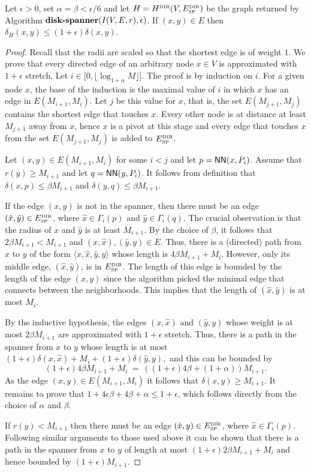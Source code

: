 \documentclass[proceedings]{stacs}
\theoremstyle{plain}\newtheorem{satz}[thm]{Satz}
\theoremstyle{definition}\newtheorem{crucial}[thm]{Crucial Definition}
\newcommand{\SPAN}{\mbox{\bf disk-spanner}}
\newcommand{\NN}{\mbox{\sf NN}}
\def\SP{\mbox{\tiny SP}}
\def\DIR{\mbox{\tiny DIR}}
\begin{document}
\begin{lemma}[Stretch]
Let $\epsilon > 0$, set $\alpha = \beta < \epsilon/6$ and let
$H=H^{\DIR}(V,E_{\SP}^{\DIR})$ be the graph returned by Algorithm
$\SPAN(I(V,E,r),\epsilon)$. If $(x,y)\in E$ then $\delta_H(x,y)
\leq (1+\epsilon)\delta(x,y)$.
\end{lemma}
\begin{proof}
Recall that the radii are scaled so that the shortest edge is of
weight $1$. We prove that every directed edge of an arbitrary node
$x\in V$ is approximated with $1+\epsilon$ stretch. Let $i\in
[0,\lfloor\log_{1+\alpha}M\rfloor$]. The proof is by induction on
$i$. For a given node $x$, the base of the induction is the
maximal value of $i$ in which $x$ has an edge in $E(M_{i+1},M_i)$.
Let $j$ be this value for $x$, that is, the set $E(M_{j+1},M_j)$
contains the shortest edge that touches $x$. Every other node is
at distance at least $M_{j+1}$ away from $x$, hence $x$ is a pivot
at this stage and every edge that touches $x$ from the set
$E(M_{j+1},M_j)$ is added to $E_{\SP}^{\DIR}$.

Let $(x,y) \in E(M_{i+1},M_i)$ for some $i<j$ and let
$p=\NN(x,P_i)$. Assume that $r(y)\geq M_{i+1}$ and let
$q=\NN(y,P_i)$. It follows from definition that $\delta(x,p) \leq
\beta M_{i+1}$ and $\delta(y,q) \leq \beta M_{i+1}$.

If the edge $(x,y)$ is not in the spanner, then there must be an
edge $(\hat{x},\hat{y})\in E_{\SP}^{\DIR}$, where $\hat{x}\in
\Gamma_i(p)$ and $\hat{y}\in \Gamma_i(q)$. The crucial observation
is that the radius of $x$ and $\hat{y}$ is at least $M_{i+1}$. By
the choice of $\beta$, it follows that $2\beta M_{i+1}< M_{i+1}$
and $(x,\hat{x}),(\hat{y},y)\in E$. Thus, there is a (directed)
path from $x$ to $y$ of the form $\langle
x,\hat{x},\hat{y},y\rangle$ whose length is $4\beta M_{i+1}+M_i$.
However, only its middle edge, $(\hat{x},\hat{y})$, is in
$E_{\SP}^{\DIR}$. The length of this edge is bounded by the length
of the edge $(x,y)$ since the algorithm picked the minimal edge
that connects between the neighborhoods. This implies that the
length of $(\hat{x},\hat{y})$ is at most $M_i$.

By the inductive hypothesis, the edges $(x,\hat{ x})$ and
$(\hat{y},y)$ whose weight is at most $2\beta M_{i+1}$ are
approximated with $1+\epsilon$ stretch. Thus, there is a path in
the spanner from $x$ to $y$ whose length is at most
$(1+\epsilon)\delta(x,\hat{x})+M_i+(1+\epsilon)\delta(\hat{y},y),$
and this can be bounded by
$$(1+\epsilon)4\beta M_{i+1}+M_i ~=~
((1+\epsilon)4\beta +(1+\alpha)) M_{i+1}.$$ As the edge $(x,y) \in
E(M_{i+1},M_i)$ it follows that $\delta(x,y)\geq M_{i+1}$. It
remains to prove that $1 + 4\epsilon\beta + 4\beta + \alpha \leq
1+\epsilon$, which follows directly from the choice of $\alpha$
and $\beta$.

If $r(y) < M_{i+1}$ then there must be an edge $(\hat{x},y)\in
E_{\SP}^{\DIR}$, where $\hat{x}\in \Gamma_i(p)$. Following similar
arguments to those used above it can be shown that there is a path
in the spanner from $x$ to $y$ of length at most
$(1+\epsilon)2\beta M_{i+1}+M_i$ and hence bounded by
$(1+\epsilon)M_{i+1}$.
\end{proof}
\end{document}
